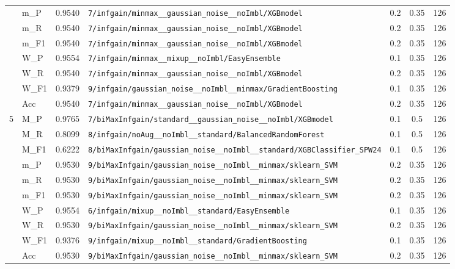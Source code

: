 \begin{table}[htbp]
\begin{tabular}{|c|l|c|>{\ttfamily\footnotesize}p{7.2cm}|c|c|c|}
 & m\_P & 0.9540 & \texttt{7/infgain/minmax\_\_gaussian\_noise\_\_noImbl/XGBmodel} & 0.2 & 0.35  & 126 \\ 
 & m\_R & 0.9540 & \texttt{7/infgain/minmax\_\_gaussian\_noise\_\_noImbl/XGBmodel} & 0.2 & 0.35  & 126 \\ 
 & m\_F1 & 0.9540 & \texttt{7/infgain/minmax\_\_gaussian\_noise\_\_noImbl/XGBmodel} & 0.2 & 0.35  & 126 \\ 
 & W\_P & 0.9554 & \texttt{7/infgain/minmax\_\_mixup\_\_noImbl/EasyEnsemble} & 0.1 & 0.35  & 126 \\ 
 & W\_R & 0.9540 & \texttt{7/infgain/minmax\_\_gaussian\_noise\_\_noImbl/XGBmodel} & 0.2 & 0.35  & 126 \\ 
 & W\_F1 & 0.9379 & \texttt{9/infgain/gaussian\_noise\_\_noImbl\_\_minmax/GradientBoosting} & 0.1 & 0.35  & 126 \\ 
 & Acc & 0.9540 & \texttt{7/infgain/minmax\_\_gaussian\_noise\_\_noImbl/XGBmodel} & 0.2 & 0.35  & 126 \\ 
\hline
\multirow{10}{*}{5} & M\_P & 0.9765 & \texttt{7/biMaxInfgain/standard\_\_gaussian\_noise\_\_noImbl/XGBmodel} & 0.1 & 0.5  & 126 \\ 
 & M\_R & 0.8099 & \texttt{8/infgain/noAug\_\_noImbl\_\_standard/BalancedRandomForest} & 0.1 & 0.5  & 126 \\ 
 & M\_F1 & 0.6222 & \texttt{8/biMaxInfgain/gaussian\_noise\_\_noImbl\_\_standard/XGBClassifier\_SPW24} & 0.1 & 0.5  & 126 \\ 
 & m\_P & 0.9530 & \texttt{9/biMaxInfgain/gaussian\_noise\_\_noImbl\_\_minmax/sklearn\_SVM} & 0.2 & 0.35  & 126 \\ 
 & m\_R & 0.9530 & \texttt{9/biMaxInfgain/gaussian\_noise\_\_noImbl\_\_minmax/sklearn\_SVM} & 0.2 & 0.35  & 126 \\ 
 & m\_F1 & 0.9530 & \texttt{9/biMaxInfgain/gaussian\_noise\_\_noImbl\_\_minmax/sklearn\_SVM} & 0.2 & 0.35  & 126 \\ 
 & W\_P & 0.9554 & \texttt{6/infgain/mixup\_\_noImbl\_\_standard/EasyEnsemble} & 0.1 & 0.35  & 126 \\ 
 & W\_R & 0.9530 & \texttt{9/biMaxInfgain/gaussian\_noise\_\_noImbl\_\_minmax/sklearn\_SVM} & 0.2 & 0.35  & 126 \\ 
 & W\_F1 & 0.9376 & \texttt{9/infgain/mixup\_\_noImbl\_\_standard/GradientBoosting} & 0.1 & 0.35  & 126 \\ 
 & Acc & 0.9530 & \texttt{9/biMaxInfgain/gaussian\_noise\_\_noImbl\_\_minmax/sklearn\_SVM} & 0.2 & 0.35  & 126 \\ 
\hline
\end{tabular}
\end{table}
